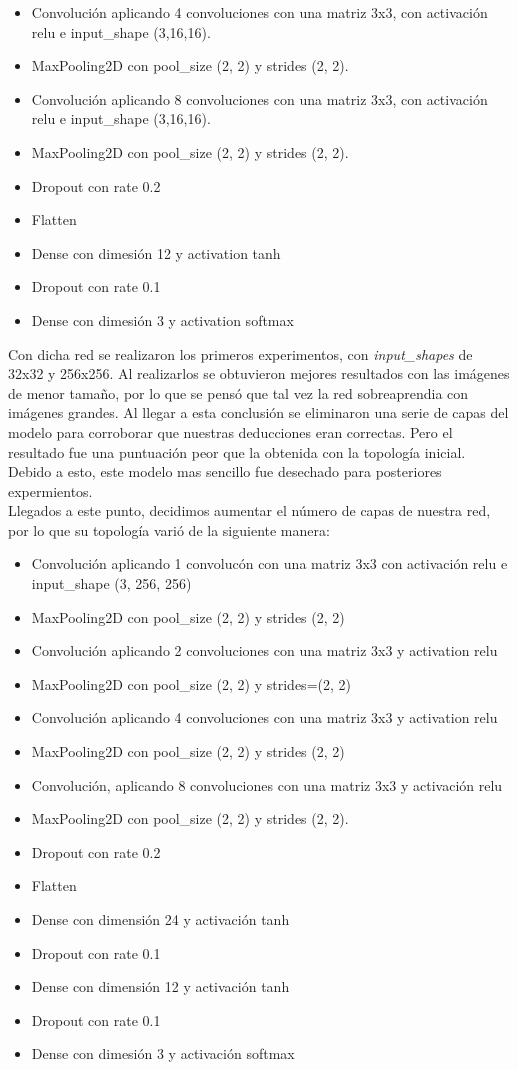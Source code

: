 \begin{itemize}
\item Convolución aplicando 4 convoluciones con una matriz 3x3, con activación relu e input\_shape (3,16,16).
\item MaxPooling2D con pool\_size (2, 2) y strides (2, 2).
\item Convolución aplicando 8 convoluciones con una matriz 3x3, con activación relu e input\_shape (3,16,16).
\item MaxPooling2D con pool\_size (2, 2) y strides (2, 2).
\item Dropout con rate 0.2
\item Flatten
\item Dense con dimesión 12 y activation tanh
\item Dropout con rate 0.1
\item Dense con dimesión 3 y activation softmax
\end{itemize}

Con dicha red se realizaron los primeros experimentos, con \textit{input\_shapes} de 32x32 y 256x256. Al realizarlos se obtuvieron mejores resultados con las imágenes de menor tamaño, por lo que se pensó que tal vez la red sobreaprendia con imágenes grandes. Al llegar a esta conclusión se eliminaron una serie de capas del modelo para corroborar que nuestras deducciones eran correctas. Pero el resultado fue una puntuación peor que la obtenida con la topología inicial. Debido a esto, este modelo mas sencillo fue desechado para posteriores expermientos.\\

Llegados a este punto, decidimos aumentar el número de capas de nuestra red, por lo que su topología varió de la siguiente manera:

\begin{itemize}
\item Convolución aplicando 1 convolucón con una matriz 3x3 con activación relu e input\_shape (3, 256, 256)
\item MaxPooling2D con pool\_size (2, 2) y strides (2, 2)
\item Convolución aplicando 2 convoluciones con una matriz 3x3 y activation relu
\item MaxPooling2D con pool\_size (2, 2) y strides=(2, 2)
\item Convolución aplicando 4 convoluciones con una matriz 3x3 y activation relu
\item MaxPooling2D con pool\_size (2, 2) y strides (2, 2)
\item Convolución, aplicando 8 convoluciones con una matriz 3x3 y activación relu
\item MaxPooling2D con pool\_size (2, 2) y strides (2, 2).
\item Dropout con rate 0.2
\item Flatten
\item Dense con dimensión 24 y activación tanh
\item Dropout con rate 0.1
\item Dense con dimensión 12 y activación tanh
\item Dropout con rate 0.1
\item Dense con dimesión 3 y activación softmax
\end{itemize}


